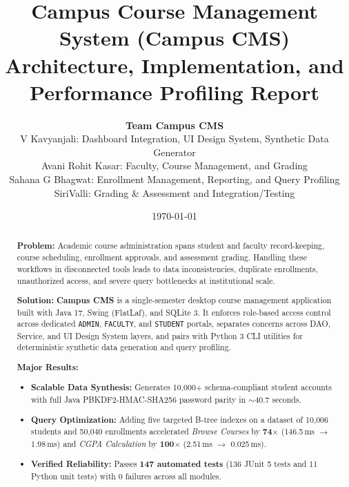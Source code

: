 \documentclass[11pt,a4paper]{article}
\title{
    \textbf{Campus Course Management System (Campus CMS)} \\
    \Large Architecture, Implementation, and Performance Profiling Report
}
\author{
    \textbf{Team Campus CMS} \\
    V Kavyanjali: Dashboard Integration, UI Design System, Synthetic Data Generator \\
    Avani Rohit Kasar: Faculty, Course Management, and Grading \\
    Sahana G Bhagwat: Enrollment Management, Reporting, and Query Profiling \\
    SiriValli: Grading \& Assessment and Integration/Testing
}
\date{\today}
\begin{document}
\maketitle

\begin{abstract}
\noindent\textbf{Problem:} Academic course administration spans student and faculty record-keeping, course scheduling, enrollment approvals, and assessment grading. Handling these workflows in disconnected tools leads to data inconsistencies, duplicate enrollments, unauthorized access, and severe query bottlenecks at institutional scale.

\medskip
\noindent\textbf{Solution:} \textbf{Campus CMS} is a single-semester desktop course management application built with Java 17, Swing (FlatLaf), and SQLite 3. It enforces role-based access control across dedicated \texttt{ADMIN}, \texttt{FACULTY}, and \texttt{STUDENT} portals, separates concerns across DAO, Service, and UI Design System layers, and pairs with Python 3 CLI utilities for deterministic synthetic data generation and query profiling.

\medskip
\noindent\textbf{Major Results:}
\begin{itemize}
    \item \textbf{Scalable Data Synthesis:} Generates 10{,}000+ schema-compliant student accounts with full Java PBKDF2-HMAC-SHA256 password parity in $\sim$40.7 seconds.
    \item \textbf{Query Optimization:} Adding five targeted B-tree indexes on a dataset of 10{,}006 students and 50{,}040 enrollments accelerated \emph{Browse Courses} by \textbf{74$\times$} (146.5\,ms $\rightarrow$ 1.98\,ms) and \emph{CGPA Calculation} by \textbf{100$\times$} (2.51\,ms $\rightarrow$ 0.025\,ms).
    \item \textbf{Verified Reliability:} Passes \textbf{147 automated tests} (136 JUnit 5 tests and 11 Python unit tests) with 0 failures across all modules.
\end{itemize}
\end{abstract}

\tableofcontents
\newpage












\end{document}
